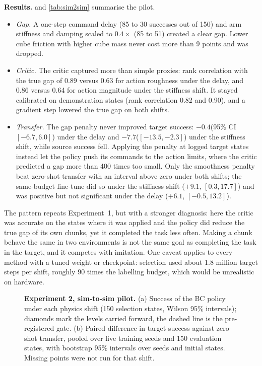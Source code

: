 \textbf{Results.}  and \cref{tab:sim2sim} summarise the pilot.
\begin{itemize}[leftmargin=*, itemsep=2pt]
  \item \emph{Gap.} A one-step command delay (85 to 30 successes out of 150) and arm stiffness and damping scaled to $0.4\times$ (85 to 51) created a clear gap. Lower cube friction with higher cube mass never cost more than 9 points and was dropped.
  \item \emph{Critic.} The critic captured more than simple proxies: rank correlation with the true gap of 0.89 versus 0.63 for action roughness under the delay, and 0.86 versus 0.64 for action magnitude under the stiffness shift. It stayed calibrated on demonstration states (rank correlation 0.82 and 0.90), and a gradient step lowered the true gap on both shifts.
  \item \emph{Transfer.} The gap penalty never improved target success: $-0.4$\pp (95\% CI $[-6.7, 6.0]$) under the delay and $-7.7$\pp ($[-13.5,-2.3]$) under the stiffness shift, while source success fell. Applying the penalty at logged target states instead let the policy push its commands to the action limits, where the critic predicted a gap more than 400 times too small. Only the smoothness penalty beat zero-shot transfer with an interval above zero under both shifts; the same-budget fine-tune did so under the stiffness shift ($+9.1$\pp, $[0.3, 17.7]$) and was positive but not significant under the delay ($+6.1$\pp, $[-0.5, 13.2]$).
\end{itemize}
The pattern repeats Experiment~1, but with a stronger diagnosis: here the critic was accurate on the states where it was applied and the policy did reduce the true gap of its own chunks, yet it completed the task less often. Making a chunk behave the same in two environments is not the same goal as completing the task in the target, and it competes with imitation. One caveat applies to every method with a tuned weight or checkpoint: selection used about 1.8 million target steps per shift, roughly 90 times the labelling budget, which would be unrealistic on hardware.

\begin{figure}[t]
  \centering
  \caption{\textbf{Experiment 2, sim-to-sim pilot.} (a) Success of the BC policy under each physics shift (150 selection states, Wilson 95\% intervals); diamonds mark the levels carried forward, the dashed line is the pre-registered gate. (b) Paired difference in target success against zero-shot transfer, pooled over five training seeds and 150 evaluation states, with bootstrap 95\% intervals over seeds and initial states. Missing points were not run for that shift.}
  \label{fig:sim2sim}
\end{figure}

